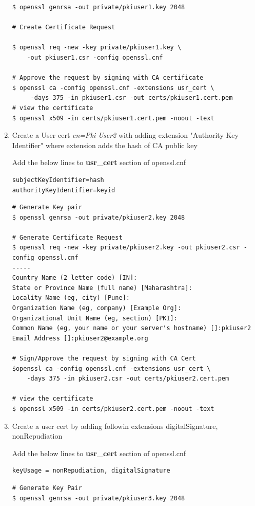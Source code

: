 \documentclass[12pt]{report}
\begin{document}
\begin{enumerate}[label*=\arabic*.]
\begin{lstlisting}[style=BashInputStyle]
$ openssl genrsa -out private/pkiuser1.key 2048
        
# Create Certificate Request

$ openssl req -new -key private/pkiuser1.key \
    -out pkiuser1.csr -config openssl.cnf

# Approve the request by signing with CA certificate
$ openssl ca -config openssl.cnf -extensions usr_cert \
     -days 375 -in pkiuser1.csr -out certs/pkiuser1.cert.pem
# view the certificate
$ openssl x509 -in certs/pkiuser1.cert.pem -noout -text
        \end{lstlisting}
    \item Create a User cert \textit{cn=Pki User2} with adding extension "Authority Key Identifier" where 
        extension adds the hash of CA public key

        Add the below lines to \textbf{usr\_cert} section of openssl.cnf
        \begin{lstlisting}
subjectKeyIdentifier=hash
authorityKeyIdentifier=keyid
        \end{lstlisting}
        \begin{lstlisting}[style=bashInputStyle]
# Generate Key pair
$ openssl genrsa -out private/pkiuser2.key 2048

# Generate Certificate Request 
$ openssl req -new -key private/pkiuser2.key -out pkiuser2.csr -config openssl.cnf
-----
Country Name (2 letter code) [IN]:
State or Province Name (full name) [Maharashtra]:
Locality Name (eg, city) [Pune]:
Organization Name (eg, company) [Example Org]:
Organizational Unit Name (eg, section) [PKI]:
Common Name (eg, your name or your server's hostname) []:pkiuser2
Email Address []:pkiuser2@example.org

# Sign/Approve the request by signing with CA Cert
$openssl ca -config openssl.cnf -extensions usr_cert \
    -days 375 -in pkiuser2.csr -out certs/pkiuser2.cert.pem

# view the certificate
$ openssl x509 -in certs/pkiuser2.cert.pem -noout -text
        \end{lstlisting}
    \item Create a user cert by adding followin extensions digitalSignature, nonRepudiation

        Add the below lines to \textbf{usr\_cert} section of openssl.cnf
        \begin{lstlisting}
keyUsage = nonRepudiation, digitalSignature
        \end{lstlisting}
        \begin{lstlisting}[style=bashInputStyle]
# Generate Key Pair
$ openssl genrsa -out private/pkiuser3.key 2048        


\end{lstlisting}
\end{enumerate}
\end{document}
